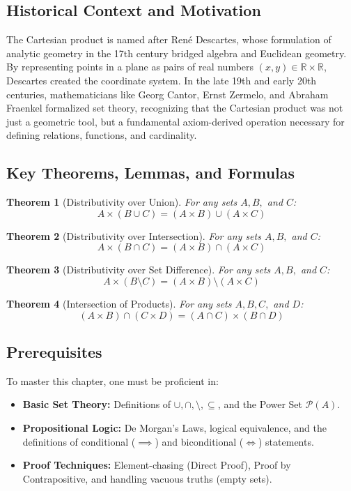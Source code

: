 \documentclass[11pt]{article}
\newtheorem{theorem}{Theorem}[section]
\newcommand{\R}{\mathbb{R}}
\newcommand{\powerset}{\mathcal{P}}
\begin{document}
\subsection{Historical Context and Motivation}
The Cartesian product is named after René Descartes, whose formulation of analytic geometry in the 17th century bridged algebra and Euclidean geometry. By representing points in a plane as pairs of real numbers $(x, y) \in \R \times \R$, Descartes created the coordinate system. In the late 19th and early 20th centuries, mathematicians like Georg Cantor, Ernst Zermelo, and Abraham Fraenkel formalized set theory, recognizing that the Cartesian product was not just a geometric tool, but a fundamental axiom-derived operation necessary for defining relations, functions, and cardinality.

\subsection{Key Theorems, Lemmas, and Formulas}
\begin{theorem}[Distributivity over Union]
For any sets $A, B,$ and $C$:
\[ A \times (B \cup C) = (A \times B) \cup (A \times C) \]
\end{theorem}

\begin{theorem}[Distributivity over Intersection]
For any sets $A, B,$ and $C$:
\[ A \times (B \cap C) = (A \times B) \cap (A \times C) \]
\end{theorem}

\begin{theorem}[Distributivity over Set Difference]
For any sets $A, B,$ and $C$:
\[ A \times (B \setminus C) = (A \times B) \setminus (A \times C) \]
\end{theorem}

\begin{theorem}[Intersection of Products]
For any sets $A, B, C,$ and $D$:
\[ (A \times B) \cap (C \times D) = (A \cap C) \times (B \cap D) \]
\end{theorem}

\subsection{Prerequisites}
To master this chapter, one must be proficient in:
\begin{itemize}
    \item \textbf{Basic Set Theory:} Definitions of $\cup, \cap, \setminus, \subseteq$, and the Power Set $\powerset(A)$.
    \item \textbf{Propositional Logic:} De Morgan's Laws, logical equivalence, and the definitions of conditional ($\implies$) and biconditional ($\iff$) statements.
    \item \textbf{Proof Techniques:} Element-chasing (Direct Proof), Proof by Contrapositive, and handling vacuous truths (empty sets).
\end{itemize}
\end{document}
